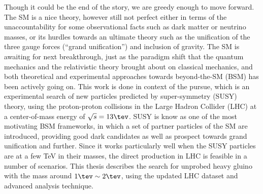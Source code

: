 Though it could be the end of the story, we are greedy enough to move forward.
The SM is a nice theory, however still not perfect either in terms of the unaccountability for some observational facts such as dark matter or neutrino masses, 
or its hurdles towards an ultimate theory such as the unification of the three gauge forces (``grand unification'') and inclusion of gravity. 
The SM is awaiting for next breakthrough, 
just as the paradigm shift that the quantum mechanics and the relativistic theory brought about on classical mechanics, 
and both theoretical and experimental approaches towards beyond-the-SM (BSM) has been actively going on.
This work is done in context of the pursue, which is an experimental search of new particles predicted by super-symmetry (SUSY) theory,
 using the proton-proton collisions in the Large Hadron Collider (LHC) at a center-of-mass energy of $\sqrt{s}=13\tev$.
SUSY is know as one of the most motivating BSM frameworks, in which a set of partner particles of the SM are introduced, 
providing good dark candidates as well as prospect towards grand unification and further.
Since it works particularly well when the SUSY particles are at a few TeV in their masses, the direct production in LHC is feasible in a number of scenarios.
This thesis describes the search for unprobed heavy gluino with the mass around $1\tev\sim2\tev$, using the updated LHC dataset and advanced analysis technique.


